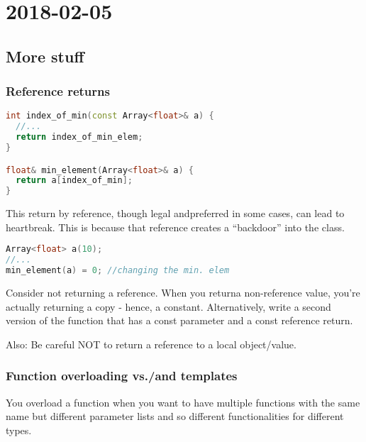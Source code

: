 \section{2018-02-05}

\subsection{More stuff}

\subsubsection{Reference returns}

\begin{lstlisting}[language=C++]
int index_of_min(const Array<float>& a) {
  //...
  return index_of_min_elem;
}

float& min_element(Array<float>& a) {
  return a[index_of_min];
}
\end{lstlisting}

This return by reference, though legal andpreferred in some cases, can lead to heartbreak. This is because that reference creates a ``backdoor'' into the class.

\begin{lstlisting}[language=C++]
Array<float> a(10);
//...
min_element(a) = 0; //changing the min. elem
\end{lstlisting}

Consider not returning a reference. When you returna non-reference value, you're actually returning a copy - hence, a constant. Alternatively, write a second version of the function that has a const parameter and a const reference return.

Also: Be careful NOT to return a reference to a local object/value.


\subsubsection{Function overloading vs./and templates}

You overload a function when you want to have multiple functions with the same name but different parameter lists and so different functionalities for different types.

